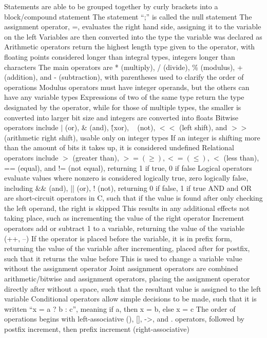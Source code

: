 \documentclass[11 pt, twoside]{article}
\newenvironment{outline*}
{
	\begin{outline}[enumerate]
	}
	{\end{outline}
}
\begin{document}
\begin{outline*}
\2 Statements are able to be grouped together by curly brackets into a block/compound statement
\2 The statement ``;'' is called the null statement
\2 The assignment operator, =, evaluates the right hand side, assigning it to the variable on the left
\3 Variables are then converted into the type the variable was declared as
\2 Arithmetic operators return the highest length type given to the operator, with floating points considered longer than integral types, integers longer than characters
\3 The main operators are * (multiply), / (divide), \% (modulus), +(addition), and - (subtraction), with parentheses used to clarify the order of operations
\3 Modulus operators must have integer operands, but the others can have any variable types
\3 Expressions of two of the same type return the type designated by the operator, while for those of multiple types, the smaller is converted into larger bit size and integers are converted into floats
\2 Bitwise operators include $|$ (or), \& (and), \^ (xor), ~ (not), $<<$ (left shift), and $>>$ (arithmetic right shift), usable only on integer types
\3 If an integer is shifting more than the amount of bits it takes up, it is considered undefined
\2 Relational operators include $>$ (greater than), $>= (\geq), <= (\leq)$, $<$ (less than), == (equal), and != (not equal), returning 1 if true, 0 if false
\2 Logical operators evaluate values where nonzero is considered logically true, zero logically false, including \&\& (and), || (or), ! (not), returning 0 if false, 1 if true
\3 AND and OR are short-circuit operators in C, such that if the value is found after only checking the left operand, the right is skipped
\4 This results in any additional effects not taking place, such as incrementing the value of the right operator
\2 Increment operators add or subtract 1 to a variable, returning the value of the variable (++, --)
\3 If the operator is placed before the variable, it is in prefix form, returning the value of the variable after incrementing, placed after for postfix, such that it returns the value before
\3 This is used to change a variable value without the assignment operator
\2 Joint assignment operators are combined arithmetic/bitwise and assignment operators, placing the assignment operator directly after without a space, such that the resultant value is assigned to the left variable
\2 Conditional operators allow simple decisions to be made, such that it is written ``x = a ? b : c'', meaning if a, then x = b, else x = c
\2 The order of operations begins with left-associative (), [], ->, and . operators, followed by postfix increment, then prefix increment (right-associative)

\end{outline*}
\end{document}
